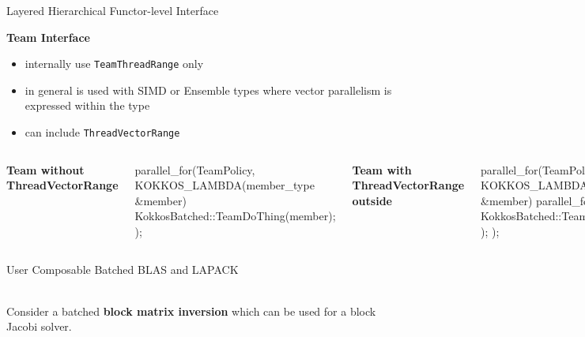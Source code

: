 \begin{frame}[fragile]{Layered Hierarchical Functor-level Interface}

  {\bf Team Interface}
  \begin{itemize}
  \item \small{internally use \verb|TeamThreadRange| only}
  \item \small{in general is used with SIMD or Ensemble types where vector parallelism is expressed within the type}
  \item \small{can include \verb|ThreadVectorRange|}
  \end{itemize}
  \begin{columns}[t,onlytextwidth]
  \textbf{\tiny{Team without ThreadVectorRange}}
  \begin{code}[frame=single, keywords={}, backgroundcolor=\color{brown!10}, basicstyle=\tiny, breaklines=true]
parallel_for(TeamPolicy, 
  KOKKOS_LAMBDA(member_type &member){
  KokkosBatched::TeamDoThing(member);
}); 
  \end{code}

  \textbf{\tiny{Team with ThreadVectorRange outside}}
  \begin{code}[frame=single, keywords={}, backgroundcolor=\color{brown!10}, basicstyle=\tiny, breaklines=true]
parallel_for(TeamPolicy,
 KOKKOS_LAMBDA(member_type &member){
   parallel_for(ThreadVectorRange) {
     KokkosBatched::TeamDoSomething(member);
}); }); 
  \end{code}
  \end{columns}
\end{frame}

\begin{frame}[fragile]{User Composable Batched BLAS and LAPACK}

  \textbf{} \\
  \vspace{26pt}
  Consider a batched \textbf{block matrix inversion} which can be used for a block
  Jacobi solver. \\
\end{frame}

